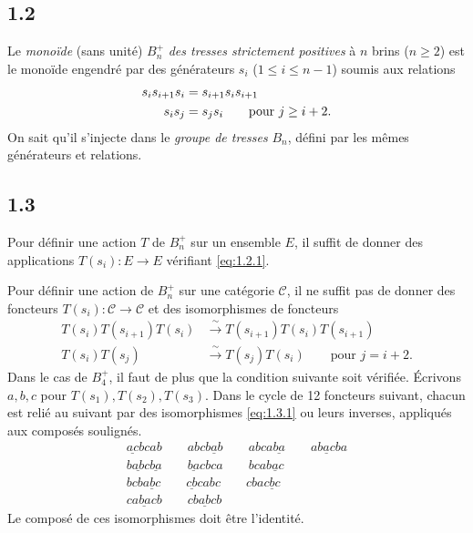 \documentclass[11pt,a4paper]{article}
\theoremstyle{plain}
\theoremstyle{definition}
\newcommand{\cC}{\mathscr{C}}
\begin{document}
\subsection*{1.2}\label{sec:1.2}

Le \emph{mono\"ide} (sans unit\'e) $B_n^+$ \emph{des tresses strictement positives} \`a $n$ brins ($n \geq 2$) est le mono\"ide engendr\'e par des g\'en\'erateurs $s_i$ ($1 \leq i \leq n-1$) soumis aux relations
\begin{align}
s_i s_{i+1} s_i &= s_{i+1} s_i s_{i+1} \label{eq:1.2.1} \\
s_i s_j &= s_j s_i \qquad \text{pour } j \geq i+2. \notag
\end{align}
On sait qu'il s'injecte dans le \emph{groupe de tresses} $B_n$, d\'efini par les m\^emes g\'en\'erateurs et relations.

\subsection*{1.3}

Pour d\'efinir une action $T$ de $B_n^+$ sur un ensemble $E$, il suffit de donner des applications $T(s_i) : E \to E$ v\'erifiant \eqref{eq:1.2.1}.

Pour d\'efinir une action de $B_n^+$ sur une cat\'egorie $\cC$, il ne suffit pas de donner des foncteurs $T(s_i) : \cC \to \cC$ et des isomorphismes de foncteurs
\begin{equation}\label{eq:1.3.1}
\begin{aligned}
T(s_i) T(s_{i+1}) T(s_i) &\xrightarrow{\;\sim\;} T(s_{i+1}) T(s_i) T(s_{i+1}) \\
T(s_i) T(s_j) &\xrightarrow{\;\sim\;} T(s_j) T(s_i) \qquad \text{pour } j = i+2.
\end{aligned}
\tag{1.3.1}
\end{equation}
Dans le cas de $B_4^+$, il faut de plus que la condition suivante soit v\'erifi\'ee. \'Ecrivons $a, b, c$ pour $T(s_1), T(s_2), T(s_3)$. Dans le cycle de 12 foncteurs suivant, chacun est reli\'e au suivant par des isomorphismes \eqref{eq:1.3.1} ou leurs inverses, appliqu\'es aux compos\'es soulign\'es.
\begin{equation}\label{eq:1.3.2}
\begin{gathered}
\underline{ac}bcab \qquad abc\underline{bab} \qquad abca\underline{ba} \qquad a\underline{bac}ba \\
b\underline{ab}c\underline{ba} \qquad \underline{ba}cbca \qquad bca\underline{bac} \\
bcb\underline{abc} \qquad \underline{cb}cabc \qquad cba\underline{cbc} \\
c\underline{abac}b \qquad c\underline{babc}b
\end{gathered}
\tag{1.3.2}
\end{equation}
Le compos\'e de ces isomorphismes doit \^etre l'identit\'e.
\end{document}
